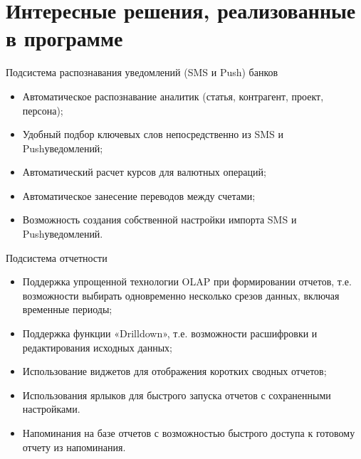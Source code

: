 \documentclass[a4paper,10pt,russian]{sphinxmanual}
\begin{document}
\section{Интересные решения, реализованные в программе}
\label{\detokenize{about:id3}}
\sphinxAtStartPar
Подсистема распознавания уведомлений (SMS и Push) банков
\begin{itemize}
\item {} 
\sphinxAtStartPar
Автоматическое распознавание аналитик (статья, контрагент, проект, персона);

\item {} 
\sphinxAtStartPar
Удобный подбор ключевых слов непосредственно из SMS и Push\sphinxhyphen{}уведомлений;

\item {} 
\sphinxAtStartPar
Автоматический расчет курсов для валютных операций;

\item {} 
\sphinxAtStartPar
Автоматическое занесение переводов между счетами;

\item {} 
\sphinxAtStartPar
Возможность создания собственной настройки импорта SMS и Push\sphinxhyphen{}уведомлений.

\end{itemize}

\sphinxAtStartPar
Подсистема отчетности
\begin{itemize}
\item {} 
\sphinxAtStartPar
Поддержка упрощенной технологии OLAP при формировании отчетов, т.е. возможности выбирать одновременно несколько срезов данных, включая временные периоды;

\item {} 
\sphinxAtStartPar
Поддержка функции «Drilldown», т.е. возможности расшифровки и редактирования исходных данных;

\item {} 
\sphinxAtStartPar
Использование виджетов для отображения коротких сводных отчетов;

\item {} 
\sphinxAtStartPar
Использования ярлыков для быстрого запуска отчетов с сохраненными настройками.

\item {} 
\sphinxAtStartPar
Напоминания на базе отчетов с возможностью быстрого доступа к готовому отчету из напоминания.

\end{itemize}
\end{document}
